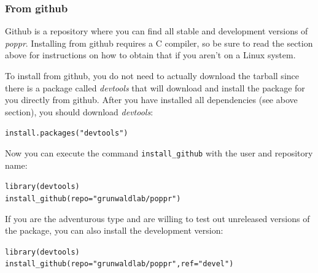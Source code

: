 \documentclass[letterpaper]{article}\usepackage[]{graphicx}\usepackage[]{color}
\makeatletter
\newcommand{\hlstr}[1]{\textcolor[rgb]{0.651,0.522,0}{#1}}%
\newcommand{\hlstd}[1]{\textcolor[rgb]{0,0,0}{#1}}%
\newcommand{\hlkwc}[1]{\textcolor[rgb]{0,0.502,0.753}{#1}}%
\newcommand{\hlkwd}[1]{\textcolor[rgb]{0,0.267,0.4}{#1}}%
\newenvironment{kframe}{%
 \def\at@end@of@kframe{}%
 \ifinner\ifhmode%
  \def\at@end@of@kframe{\end{minipage}}%
  \begin{minipage}{\columnwidth}%
 \fi\fi%
 \def\FrameCommand##1{\hskip\@totalleftmargin \hskip-\fboxsep
 \colorbox{shadecolor}{##1}\hskip-\fboxsep
     \hskip-\linewidth \hskip-\@totalleftmargin \hskip\columnwidth}%
 \MakeFramed {\advance\hsize-\width
   \@totalleftmargin\z@ \linewidth\hsize
   \@setminipage}}%
 {\par\unskip\endMakeFramed%
 \at@end@of@kframe}
\newenvironment{knitrout}{}{} %
\newcommand{\tab}{\hspace*{1em}}
\makeatother
\begin{document}
\subsubsection{From github}
\tab\tab Github is a repository where you can find all stable and development versions of \textit{poppr}. Installing from github requires a C compiler, so be sure to read the section above for instructions on how to obtain that if you aren't on a Linux system. 

To install from github, you do not need to actually download the tarball since there is a package called \textit{devtools} that will download and install the package for you directly from github. After you have installed all dependencies (see above section), you should download \textit{devtools}:
\begin{knitrout}\footnotesize
{}\color{fgcolor}\begin{kframe}
\begin{alltt}
\hlkwd{install.packages}\hlstd{(}\hlstr{"devtools"}\hlstd{)}
\end{alltt}
\end{kframe}
\end{knitrout}

Now you can execute the command \texttt{install\_github} with the user and repository name:
\begin{knitrout}\footnotesize
{}\color{fgcolor}\begin{kframe}
\begin{alltt}
\hlkwd{library}\hlstd{(devtools)}
\hlkwd{install_github}\hlstd{(}\hlkwc{repo} \hlstd{=} \hlstr{"grunwaldlab/poppr"}\hlstd{)}
\end{alltt}
\end{kframe}
\end{knitrout}


If you are the adventurous type and are willing to test out unreleased versions of the package, you can also install the development version:
\begin{knitrout}\footnotesize
{}\color{fgcolor}\begin{kframe}
\begin{alltt}
\hlkwd{library}\hlstd{(devtools)}
\hlkwd{install_github}\hlstd{(}\hlkwc{repo} \hlstd{=} \hlstr{"grunwaldlab/poppr"}\hlstd{,} \hlkwc{ref} \hlstd{=} \hlstr{"devel"}\hlstd{)}
\end{alltt}
\end{kframe}
\end{knitrout}
\end{document}
